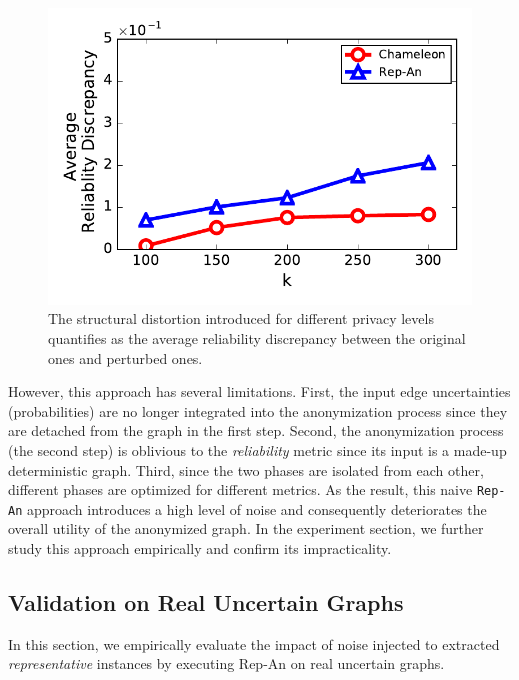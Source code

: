 \begin{figure}[!htb]
{\begin{minipage}[l]{0.62\columnwidth}
        \includegraphics[width=1\linewidth]{rep_exp/ppi_rel.pdf}
      \end{minipage}
      }

    \vspace{-10pt}
    \caption{The structural distortion introduced for different privacy levels quantifies as the average reliability discrepancy between the original ones and perturbed ones.}
    \label{fig:rep_exp}
    \vspace{-5pt}
\end{figure}

However, this approach has several limitations. First, the input edge uncertainties (probabilities) are no longer integrated into the anonymization process since they are detached from the graph in the first step. Second, the anonymization process (the second step) is oblivious to the {\em reliability} metric since its input is a made-up deterministic graph. Third, since the two phases are isolated from each other, different phases are optimized for different metrics. As the result, this naive \texttt{Rep-An} approach introduces a high level of noise and consequently deteriorates the overall utility of the anonymized graph. 
In the experiment section, we further study this approach empirically and confirm its impracticality.

\subsection{Validation on Real Uncertain Graphs}
In this section, we empirically evaluate the impact of noise injected to extracted \emph{representative} instances by executing Rep-An on real uncertain graphs.

